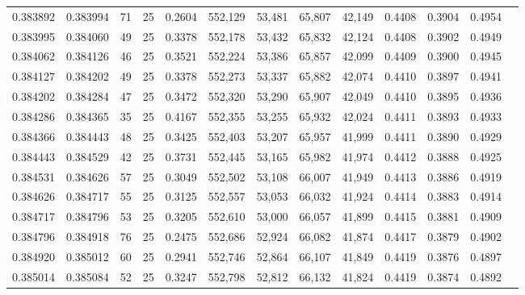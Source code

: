 \begin{tabular}{rrrrrrrrrrrrr}
0.383892 & 0.383994 &    71 &  25 &                                     0.2604 & 552,129 &  53,481 &  65,807 &  42,149 & 0.4408 & 0.3904 & 0.4954 \\
0.383995 & 0.384060 &    49 &  25 &                                     0.3378 & 552,178 &  53,432 &  65,832 &  42,124 & 0.4408 & 0.3902 & 0.4949 \\
0.384062 & 0.384126 &    46 &  25 &                                     0.3521 & 552,224 &  53,386 &  65,857 &  42,099 & 0.4409 & 0.3900 & 0.4945 \\
0.384127 & 0.384202 &    49 &  25 &                                     0.3378 & 552,273 &  53,337 &  65,882 &  42,074 & 0.4410 & 0.3897 & 0.4941 \\
0.384202 & 0.384284 &    47 &  25 &                                     0.3472 & 552,320 &  53,290 &  65,907 &  42,049 & 0.4410 & 0.3895 & 0.4936 \\
0.384286 & 0.384365 &    35 &  25 &                                     0.4167 & 552,355 &  53,255 &  65,932 &  42,024 & 0.4411 & 0.3893 & 0.4933 \\
0.384366 & 0.384443 &    48 &  25 &                                     0.3425 & 552,403 &  53,207 &  65,957 &  41,999 & 0.4411 & 0.3890 & 0.4929 \\
0.384443 & 0.384529 &    42 &  25 &                                     0.3731 & 552,445 &  53,165 &  65,982 &  41,974 & 0.4412 & 0.3888 & 0.4925 \\
0.384531 & 0.384626 &    57 &  25 &                                     0.3049 & 552,502 &  53,108 &  66,007 &  41,949 & 0.4413 & 0.3886 & 0.4919 \\
0.384626 & 0.384717 &    55 &  25 &                                     0.3125 & 552,557 &  53,053 &  66,032 &  41,924 & 0.4414 & 0.3883 & 0.4914 \\
0.384717 & 0.384796 &    53 &  25 &                                     0.3205 & 552,610 &  53,000 &  66,057 &  41,899 & 0.4415 & 0.3881 & 0.4909 \\
0.384796 & 0.384918 &    76 &  25 &                                     0.2475 & 552,686 &  52,924 &  66,082 &  41,874 & 0.4417 & 0.3879 & 0.4902 \\
0.384920 & 0.385012 &    60 &  25 &                                     0.2941 & 552,746 &  52,864 &  66,107 &  41,849 & 0.4419 & 0.3876 & 0.4897 \\
0.385014 & 0.385084 &    52 &  25 &                                     0.3247 & 552,798 &  52,812 &  66,132 &  41,824 & 0.4419 & 0.3874 & 0.4892 \\

\end{tabular}
